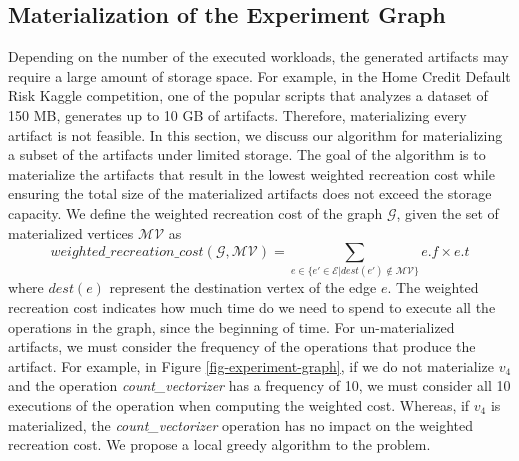 \subsection{Materialization of the Experiment Graph}\label{subsec-materialization}
Depending on the number of the executed workloads, the generated artifacts may require a large amount of storage space.
For example, in the Home Credit Default Risk Kaggle competition, one of the popular scripts that analyzes a dataset of 150 MB, generates up to 10 GB of artifacts.
Therefore, materializing every artifact is not feasible.
In this section, we discuss our algorithm for materializing a subset of the artifacts under limited storage.
The goal of the algorithm is to materialize the artifacts that result in the lowest weighted recreation cost while ensuring the total size of the materialized artifacts does not exceed the storage capacity.
We define the weighted recreation cost of the graph $\mathcal{G}$, given the set of materialized vertices $\mathcal{MV}$ as 
\[
weighted\_recreation\_cost(\mathcal{G}, \mathcal{MV}) =  \sum\limits_{e \in \{e' \in \mathcal{E}  \lvert dest(e') \notin \mathcal{MV}\}}  e.f \times e.t
\]
where $dest(e)$ represent the destination vertex of the edge $e$.
The weighted recreation cost indicates how much time do we need to spend to execute all the operations in the graph, since the beginning of time.
For un-materialized artifacts, we must consider the frequency of the operations that produce the artifact.
For example, in Figure \ref{fig-experiment-graph}, if we do not materialize $v_4$ and the operation \textit{count\_vectorizer} has a frequency of 10, we must consider all 10 executions of the operation when computing the weighted cost.
Whereas, if $v_4$ is materialized, the \textit{count\_vectorizer} operation has no impact on the weighted recreation cost.
We propose a local greedy algorithm to the problem.

